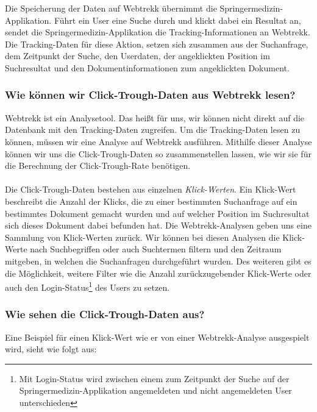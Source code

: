 Die Speicherung der Daten auf Webtrekk übernimmt die Springermedizin-Applikation. Führt ein User eine Suche durch und klickt dabei ein Resultat an, sendet die Springermedizin-Applikation die Tracking-Informationen an Webtrekk. Die Tracking-Daten für diese Aktion, setzen sich zusammen aus der Suchanfrage, dem Zeitpunkt der Suche, den Userdaten, der angeklickten Position im Suchresultat und den Dokumentinformationen zum angeklickten Dokument.

\subsubsection{Wie können wir Click-Trough-Daten aus Webtrekk lesen?}
\label{sec:Grundlagen:Grundbegriffe:Click-Trough-Daten:LesenClick-Trough-Daten}

Webtrekk ist ein Analysetool. Das heißt für uns, wir können nicht direkt auf die Datenbank mit den Tracking-Daten zugreifen. Um die Tracking-Daten lesen zu können, müssen wir eine Analyse auf Webtrekk ausführen. Mithilfe dieser Analyse können wir uns die Click-Trough-Daten so zusammenstellen lassen, wie wir sie für die Berechnung der Click-Trough-Rate benötigen.
\\
\\
Die Click-Trough-Daten bestehen aus einzelnen \textit{Klick-Werten}. Ein Klick-Wert beschreibt die Anzahl der Klicks, die zu einer bestimmten Suchanfrage auf ein bestimmtes Dokument gemacht wurden und auf welcher Position im Suchresultat sich dieses Dokument dabei befunden hat. Die Webtrekk-Analysen geben uns eine Sammlung von Klick-Werten zurück. Wir können bei diesen Analysen die Klick-Werte nach Suchbegriffen oder auch Suchtermen filtern und den Zeitraum mitgeben, in welchen die Suchanfragen durchgeführt wurden. Des weiteren gibt es die Möglichkeit, weitere Filter wie die Anzahl zurückzugebender Klick-Werte oder auch den \glqq Login-Status\footnote{Mit Login-Status wird zwischen einem zum Zeitpunkt der Suche auf der Springermedizin-Applikation angemeldeten und nicht angemeldeten User unterschieden} des Users\grqq{} zu setzen. 

\subsubsection{Wie sehen die Click-Trough-Daten aus?}
\label{sec:Grundlagen:Grundbegriffe:Click-Trough-Daten:AussehenClick-Trough-Daten}

Eine Beispiel für einen Klick-Wert wie er von einer Webtrekk-Analyse ausgespielt wird, sieht wie folgt aus:

